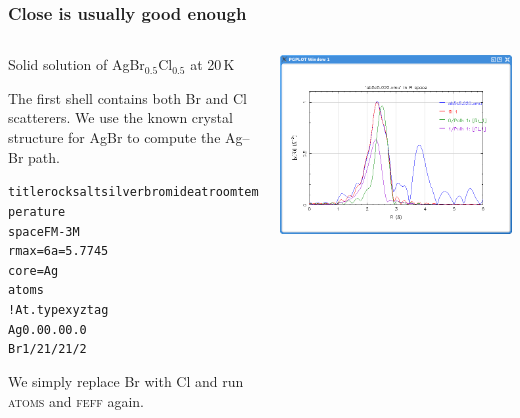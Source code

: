 \begin{frame}[fragile]
  \frametitle{Close is usually good enough}
  \begin{columns}[T]
    \begin{column}{0.5\linewidth}
      Solid solution of AgBr$_{0.5}$Cl$_{0.5}$ at 20\,K

      \bigskip

      The first shell contains both Br and Cl scatterers.  We use the
      known crystal structure for AgBr to compute the Ag--Br path.
      \begin{block}{}
        \begin{alltt}
          \tiny
 {\color{Green4}title rocksalt silver bromide at room temperature}
 {\color{Brown4}space} F M -3 M
 {\color{Brown4}rmax}=6   {\color{Brown4}a}=5.7745
 {\color{Brown4}core}=Ag
 {\color{Brown4}atoms}
 {\color{Blue4}! At.type   x     y     z      tag}
    Ag      0.0   0.0   0.0
    Br      1/2   1/2   1/2
         \end{alltt}
       \end{block}
       We simply replace Br with Cl and run \textsc{atoms} and
       \textsc{feff} again.
    \end{column}
    \begin{column}{0.5\linewidth}
      \begin{center}
        \includegraphics[width=0.9\linewidth]{images/abcfit}


\end{center}
\end{column}
\end{columns}
\end{frame}
